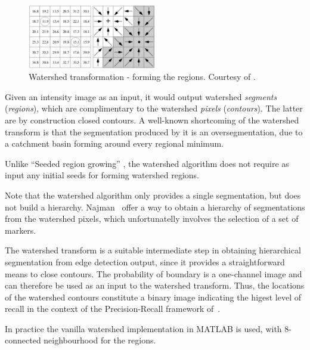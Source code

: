 \begin{figure}[ht!]
 \centering
 \includegraphics[width=0.5\textwidth]{images/gPb-OWT-UCM/watershed-transformation-forming-regions.png}
 \caption[Watershed transformation - forming the regions]{Watershed transformation - forming the regions. Courtesy of \cite{MarcoBlog2007Watershed}.}
 \label{fig:watershed-transformation-forming-regions}
\end{figure}

Given an intensity %
image as an input, it would output watershed \textit{segments} (\textit{regions}), which are complimentary to the watershed \textit{pixels} (\textit{contours}). The latter are by construction closed contours. A well-known shortcoming of the watershed transform is that the 
segmentation produced by it is an oversegmentation, due to a catchment basin forming around every regional minimum.

Unlike ``Seeded region growing'' \cite{Adams1994seeded}, the watershed algorithm does not require as input any initial seeds for forming watershed regions.

Note that the watershed algorithm only provides a single segmentation, but does not build a hierarchy. %
Najman~\etal \cite{Najman1996geodesic} offer a way to obtain a hierarchy of segmentations from the watershed pixels, which unfortunatelly involves the selection of a set of markers.

The watershed transform is a suitable intermediate step in obtaining hierarchical segmentation from edge detection output, since it provides a straightforward means to close contours. The probability of boundary is a one-channel image and can therefore be used as an input to the watershed transform. Thus, the locations of the watershed contours constitute a binary image indicating the higest level of recall in the context of the Precision-Recall framework of~\cite{Arbelaez11}. %

In practice the vanilla watershed implementation in MATLAB \cite{MATLABwatershed} is used, with 8-connected neighbourhood for the regions.


